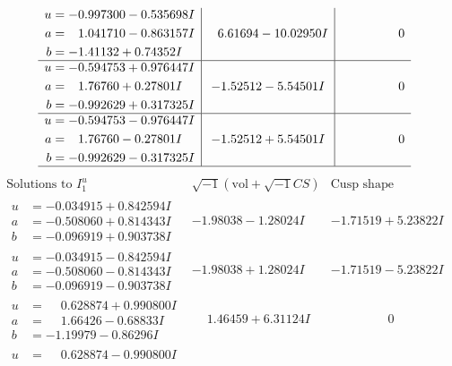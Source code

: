 \documentclass[1p]{elsarticle_modified}
\theoremstyle{definition}
\newcommand{\I}{\sqrt{-1}}
\begin{document}
$$\begin{array}{c|c|c}
\begin{aligned}
u &= -0.997300 - 0.535698 I \\
a &= \phantom{-}1.041710 - 0.863157 I \\
b &= -1.41132 + 0.74352 I\end{aligned}
 & \phantom{-}6.61694 - 10.02950 I & \phantom{-0.000000 } 0 \\ \hline\begin{aligned}
u &= -0.594753 + 0.976447 I \\
a &= \phantom{-}1.76760 + 0.27801 I \\
b &= -0.992629 + 0.317325 I\end{aligned}
 & -1.52512 - 5.54501 I & \phantom{-0.000000 } 0 \\ \hline\begin{aligned}
u &= -0.594753 - 0.976447 I \\
a &= \phantom{-}1.76760 - 0.27801 I \\
b &= -0.992629 - 0.317325 I\end{aligned}
 & -1.52512 + 5.54501 I & \phantom{-0.000000 } 0\\
 \hline 
 \end{array}$$\newpage$$\begin{array}{c|c|c}  
\text{Solutions to }I^u_{1}& \I (\text{vol} + \sqrt{-1}CS) & \text{Cusp shape}\\
 \hline 
\begin{aligned}
u &= -0.034915 + 0.842594 I \\
a &= -0.508060 + 0.814343 I \\
b &= -0.096919 + 0.903738 I\end{aligned}
 & -1.98038 - 1.28024 I & -1.71519 + 5.23822 I \\ \hline\begin{aligned}
u &= -0.034915 - 0.842594 I \\
a &= -0.508060 - 0.814343 I \\
b &= -0.096919 - 0.903738 I\end{aligned}
 & -1.98038 + 1.28024 I & -1.71519 - 5.23822 I \\ \hline\begin{aligned}
u &= \phantom{-}0.628874 + 0.990800 I \\
a &= \phantom{-}1.66426 - 0.68833 I \\
b &= -1.19979 - 0.86296 I\end{aligned}
 & \phantom{-}1.46459 + 6.31124 I & \phantom{-0.000000 } 0 \\ \hline\begin{aligned}
u &= \phantom{-}0.628874 - 0.990800 I \\

\end{aligned}
\end{array}$$
\end{document}
